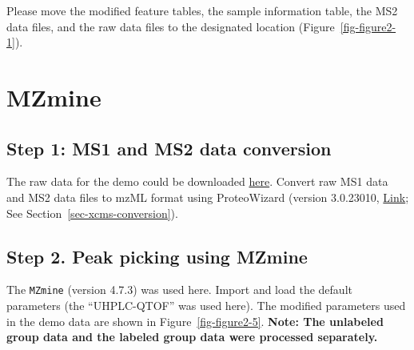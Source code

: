 \documentclass[
  letterpaper,
  DIV=11,
  numbers=noendperiod]{scrreprt}
\begin{document}
Please move the modified feature tables, the sample information table,
the MS2 data files, and the raw data files to the designated location
(Figure~\ref{fig-figure2-1}).

\section{MZmine}\label{sec-mzmine}

\subsection{Step 1: MS1 and MS2 data
conversion}\label{step-1-ms1-and-ms2-data-conversion-1}

The raw data for the demo could be downloaded
\href{https://github.com/DoddLab/IsoPairFinder_DemoData_DiffTools/tree/main/00_raw_data}{here}.
Convert raw MS1 data and MS2 data files to mzML format using
ProteoWizard (version 3.0.23010,
\href{https://proteowizard.sourceforge.io/}{Link}; See
Section~\ref{sec-xcms-conversion}).

\subsection{Step 2. Peak picking using
MZmine}\label{step-2.-peak-picking-using-mzmine}

The \texttt{MZmine} (version 4.7.3) was used here. Import and load the
default parameters (the ``UHPLC-QTOF'' was used here). The modified
parameters used in the demo data are shown in
Figure~\ref{fig-figure2-5}. \textbf{Note: The unlabeled group data and
the labeled group data were processed separately.}
\end{document}
